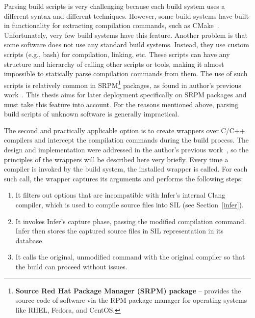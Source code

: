 Parsing build scripts is very challenging because each build system uses a different syntax and different techniques. However, some build systems have built-in functionality for extracting compilation commands, such as CMake~\cite{cmake-doc}. Unfortunately, very few build systems have this feature. Another problem is that some software does not use any standard build systems. Instead, they use custom scripts (e.g., bash) for compilation, linking, etc. These scripts can have any structure and hierarchy of calling other scripts or tools, making it almost impossible to statically parse compilation commands from them. The use of such scripts is relatively common in SRPM\footnote{\textbf{Source Red Hat Package Manager (SRPM) package} -- provides the source code of software via the RPM package manager for operating systems like RHEL, Fedora, and CentOS.} packages, as found in author's previous work~\cite{bc}. This thesis aims for later deployment specifically on SRPM packages and must take this feature into account. For the reasons mentioned above, parsing build scripts of unknown software is generally impractical.

The second and practically applicable option is to create wrappers over C/C++ compilers and intercept the compilation commands during the build process. The design and implementation were addressed in the author's previous work~\cite{bc}, so the principles of the wrappers will be described here very briefly. Every time a compiler is invoked by the build system, the installed wrapper is called. For each such call, the wrapper captures its arguments and performs the following steps:

\begin{enumerate}
    \item It filters out options that are incompatible with Infer's internal Clang compiler, which is used to compile source files into SIL (see Section~\ref{infer}).
    \item It invokes Infer's capture phase, passing the modified compilation command. Infer then stores the captured source files in SIL representation in its database.
    \item It calls the original, unmodified command with the original compiler so that the build can proceed without issues.
\end{enumerate}


